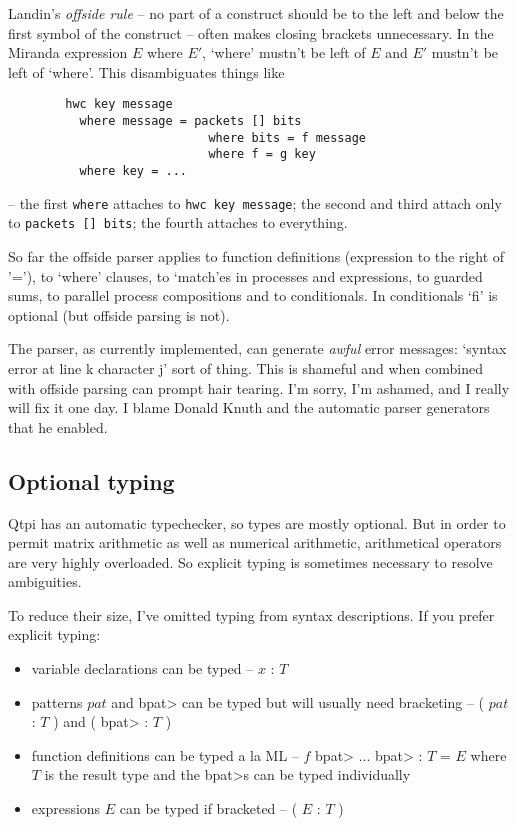 \documentclass[11pt,a4paper]{article}
\newcommand{\verbtt}[1]{\texttt{\small{}#1}}
\begin{document}
Landin's \emph{offside rule} -- no part of a construct should be to the left and below the first symbol of the construct -- often makes closing brackets unnecessary. In the Miranda expression $E$ where $E'$, `where' mustn't be left of $E$ and $E'$ mustn't be left of `where'. This disambiguates things like 

\begin{verbatim}
		hwc key message
		  where message = packets [] bits
		                    where bits = f message
		                    where f = g key
		  where key = ...
\end{verbatim}
	
-- the first \verbtt{where} attaches to \verbtt{hwc key message}; the second and third attach only to \verbtt{packets [] bits}; the fourth attaches to everything.

So far the offside parser applies to function definitions (expression to the right of '='), to `where' clauses, to `match'es in processes and expressions, to guarded sums, to parallel process compositions and to conditionals. In conditionals `fi' is optional (but offside parsing is not).

The parser, as currently implemented, can generate \emph{awful} error messages: `syntax error at line k character j' sort of thing. This is shameful and when combined with offside parsing can prompt hair tearing. I'm sorry, I'm ashamed, and I really will fix it one day. I blame Donald Knuth and the automatic parser generators that he enabled.

\subsection{Optional typing}

Qtpi has an automatic typechecker, so types are mostly optional. But in order to permit matrix arithmetic as well as numerical arithmetic, arithmetical operators are very highly overloaded. So explicit typing is sometimes necessary to resolve ambiguities.

To reduce their size, I've omitted typing from syntax descriptions. If you prefer explicit typing:  

\begin{itemize}
\item variable declarations can be typed -- $x$ : $T$
\item patterns $pat$ and \<bpat> can be typed but will usually need bracketing -- ( $pat$ : $T$ ) and ( \<bpat> : $T$ ) 
\item function definitions can be typed a la ML -- $f$ \<bpat> ... \<bpat> : $T$ = $E$  where $T$ is the result type and the \<bpat>s can be typed individually
\item expressions $E$ can be typed if bracketed -- ( $E$ : $T$ )
\end{itemize}
\end{document}
